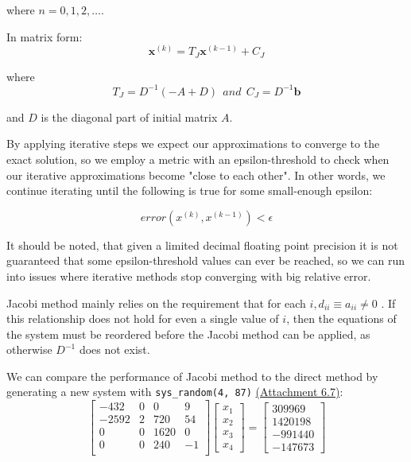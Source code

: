 \documentclass[letterpaper,12pt]{article}
\begin{document}
where $n = 0, 1, 2, \dots$.

In matrix form:
\begin{equation}
     \textbf{x}^{(k)} = T_{J}\textbf{x}^{(k-1)} + C_{J}
\end{equation}

where
\begin{equation}
     T_{J} = D^{-1}(-A+D)\  \ and \  \  C_{J} = D^{-1}\textbf{b}
\end{equation}

and $D$ is the diagonal part of initial matrix $A$.

By applying iterative steps we expect our approximations to converge to the exact solution, so we employ a metric with an epsilon-threshold to check when our iterative approximations become "close to each other". In other words, we continue iterating until the following is true for some small-enough epsilon:

$$error(x^{(k)}, x^{(k-1)}) < \epsilon$$

It should be noted, that given a limited decimal floating point precision it is not guaranteed that some epsilon-threshold values can ever be reached, so we can run into issues where iterative methods stop converging with big relative error.

Jacobi method mainly relies on the requirement that for each $i, d_{ii} \equiv a_{ii} \neq 0$ \cite{error, iterative}. If this relationship does not hold for even a single value of $i$, then the equations of the system must be reordered before the Jacobi method can be applied, as otherwise $D^{-1}$ does not exist.

We can compare the performance of Jacobi method to the direct method by generating a new system with \verb|sys_random(4, 87)| \hyperref[a:E7]{(Attachment 6.7)}:
\begin{equation}
    \begin{bmatrix}
        -432     &     0      &       0       &      9\\             
        -2592    &     2      &       720     &     54\\            
        0        &     0      &       1620    &      0\\             
        0        &     0      &       240     &      -1\\ 
    \end{bmatrix}
    \begin{bmatrix}
        x_1\\
        x_2\\
        x_3\\
        x_4
    \end{bmatrix}
    =
    \begin{bmatrix}
        309969\\
        1420198\\
        -991440\\
        -147673
    \end{bmatrix}
\end{equation}
\end{document}
